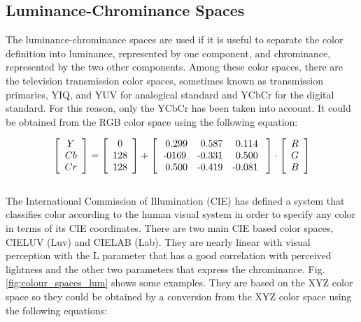\pagebreak

\subsection{Luminance-Chrominance Spaces}  %
The luminance-chrominance spaces are used if it is useful to separate the color definition into luminance, represented by one component, and chrominance, represented by the two other components. Among these color spaces, there are the television transmission color spaces, sometimes known as transmission primaries, YIQ, and YUV for analogical standard and YCbCr for the digital standard. For this reason, only the YCbCr has been taken into account. It could be obtained from the RGB color space using the following equation:

\begin{equation}\label{Ycbcr}
\left [ {  \begin{array}{c} Y  \\ Cb   \\ Cr \end{array} } \right ] = \left [{ \begin{array}{c} 0  \\ 128   \\ 128  \end{array} } \right ] +
\left [ { \begin{array}{c c c} \mbox{ 0.299}  & \mbox{ 0.587} & \mbox{ 0.114 } \\ \mbox{-0169} & \mbox{-0.331} & \mbox{ 0.500 } \\ \mbox{ 0.500} & \mbox{-0.419} & \mbox{-0.081 }  \end{array} } \right ] \cdot \left [ { \begin{array}{c} R  \\ G  \\ B  \end{array} } \right ] 
\end{equation}
\\
The International Commission of Illumination (CIE) has defined a system that classifies color according to the human visual system in order to specify any color in terms of its CIE coordinates. There are two main CIE based color spaces, CIELUV (Luv) and CIELAB (Lab). They are nearly linear with visual perception with the L parameter that has a good correlation with perceived lightness and the other two parameters that express the chrominance. Fig. \ref{fig:colour_spaces_lum} shows some examples. They are based on the XYZ color space so they could be obtained by a conversion from the XYZ color space using the following equations:

